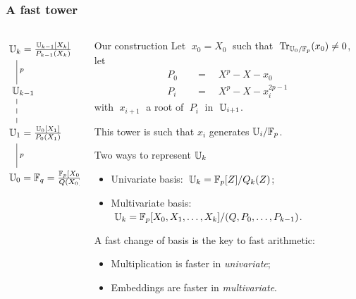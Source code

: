 \documentclass[10pt,usepdftitle=false]{beamer}
\begin{document}
\begin{frame}
  \frametitle{A fast tower}

  \vspace{-2mm}

  \begin{columns}
    \begin{column}{0.3\textwidth}
      \Large\[\xymatrix{
        *+[r]{\U_k = \frac{\U_{k-1}[X_k]}{P_{k-1}(X_k)}}\ar@{-}[d]^p\\
        *+[r]{\U_{k-1}} \ar@{--}[d]\\
        *+[r]{\U_1 = \frac{\U_0[X_1]}{P_0(X_1)}} \ar@{-}[d]^p\\
        *+[r]{\U_0 = \F_q = \frac{\F_p[X_0]}{Q(X_0)}}
      }\]
    \end{column}
    \begin{column}{0.65\textwidth}
      \begin{block}{Our construction}
        Let $\;x_0 = X_0\;$ such that
        $\;\operatorname{Tr}_{\mathbb{U}_0/\mathbb{F}_p}(x_0) \ne 0$, let
        \begin{align*}
          P_0 \quad&=\quad X^p - X - x_0\\
          P_i \quad&=\quad X^p - X - x_i^{2p-1}
        \end{align*}
        with $\;x_{i+1}\;$ a root of $\;P_i\;$ in $\;\mathbb{U}_{i+1}$.

        \alert{This tower is such that $x_i$ generates $\mathbb{U}_i/\mathbb{F}_p$.}
      \end{block}

      \begin{block}{Two ways to represent $\mathbb{U}_k$}
        \begin{itemize}
        \item Univariate basis: $\;\mathbb{U}_k=\mathbb{F}_p[Z]/Q_k(Z)$;
        \item Multivariate basis: $\;\mathbb{U}_k=\mathbb{F}_p[X_0,X_1,\ldots,X_k]/(Q,P_0,\ldots,P_{k-1})$.
        \end{itemize}
        \alert{A fast change of basis is the key to fast arithmetic:}
        \begin{itemize}
        \item Multiplication is faster in \emph{univariate};
        \item Embeddings are faster in \emph{multivariate}.
        \end{itemize}
      \end{block}
    \end{column}
  \end{columns}
\end{frame}
\end{document}
